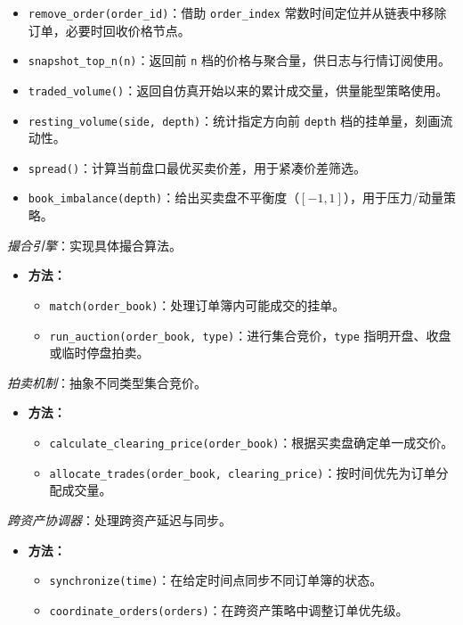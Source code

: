 \begin{description}
\begin{itemize}
\begin{itemize}
        \item \verb|remove_order(order_id)|：借助 \verb|order_index| 常数时间定位并从链表中移除订单，必要时回收价格节点。
        \item \verb|snapshot_top_n(n)|：返回前 \verb|n| 档的价格与聚合量，供日志与行情订阅使用。
        \item \verb|traded_volume()|：返回自仿真开始以来的累计成交量，供量能型策略使用。
        \item \verb|resting_volume(side, depth)|：统计指定方向前 \verb|depth| 档的挂单量，刻画流动性。
        \item \verb|spread()|：计算当前盘口最优买卖价差，用于紧凑价差筛选。
        \item \verb|book_imbalance(depth)|：给出买卖盘不平衡度（$[-1,1]$），用于压力/动量策略。
      \end{itemize}
  \end{itemize}
  \item[MatchingEngine] \emph{撮合引擎}：实现具体撮合算法。
  \begin{itemize}
    \item \textbf{方法：}
      \begin{itemize}
        \item \verb|match(order_book)|：处理订单簿内可能成交的挂单。
        \item \verb|run_auction(order_book, type)|：进行集合竞价，\verb|type| 指明开盘、收盘或临时停盘拍卖。
      \end{itemize}
  \end{itemize}
  \item[AuctionMechanism] \emph{拍卖机制}：抽象不同类型集合竞价。
  \begin{itemize}
    \item \textbf{方法：}
      \begin{itemize}
        \item \verb|calculate_clearing_price(order_book)|：根据买卖盘确定单一成交价。
        \item \verb|allocate_trades(order_book, clearing_price)|：按时间优先为订单分配成交量。
      \end{itemize}
  \end{itemize}
  \item[CrossAssetCoordinator] \emph{跨资产协调器}：处理跨资产延迟与同步。
  \begin{itemize}
    \item \textbf{方法：}
      \begin{itemize}
        \item \verb|synchronize(time)|：在给定时间点同步不同订单簿的状态。
        \item \verb|coordinate_orders(orders)|：在跨资产策略中调整订单优先级。
      \end{itemize}
  \end{itemize}
\end{description}

